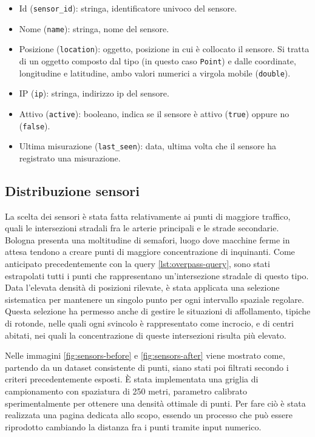 \begin{itemize}
  \item Id (\texttt{sensor\_id}): stringa, identificatore univoco del sensore.
  \item Nome (\texttt{name}): stringa, nome del sensore.
  \item Posizione (\texttt{location}): oggetto, posizione in cui è collocato il sensore.
        Si tratta di un oggetto composto dal tipo (in questo caso \texttt{Point}) e dalle coordinate,
        longitudine e latitudine, ambo valori numerici a virgola mobile (\texttt{double}).
  \item IP (\texttt{ip}): stringa, indirizzo ip del sensore.
  \item Attivo (\texttt{active}): booleano, indica se il sensore è attivo (\texttt{true})
        oppure no (\texttt{false}).
  \item Ultima misurazione (\texttt{last\_seen}): data, ultima volta che il sensore ha registrato una misurazione.
        \label{lst:sensors-properties}
\end{itemize}

\subsection{Distribuzione sensori}

La scelta dei sensori è stata fatta relativamente ai punti di maggiore traffico, quali le intersezioni stradali
fra le arterie principali e le strade secondarie. Bologna presenta una moltitudine di semafori, luogo dove macchine
ferme in attesa tendono a creare punti di maggiore concentrazione di inquinanti. Come anticipato precedentemente
con la query \ref{lst:overpass-query}, sono stati estrapolati tutti i punti che rappresentano un'intersezione
stradale di questo tipo. Data l'elevata densità di posizioni rilevate, è stata applicata una selezione sistematica
per mantenere un singolo punto per ogni intervallo spaziale regolare.
Questa selezione ha permesso anche di gestire le situazioni di affollamento, tipiche di rotonde,
nelle quali ogni svincolo è rappresentato come incrocio, e di centri abitati, nei quali la concentrazione
di queste intersezioni risulta più elevato.

Nelle immagini \ref{fig:sensors-before} e \ref{fig:sensors-after} viene mostrato come, partendo da un dataset
consistente di punti, siano stati poi filtrati secondo i criteri precedentemente esposti.
È stata implementata una griglia di campionamento con spaziatura di 250 metri, parametro calibrato
sperimentalmente per ottenere una densità ottimale di punti. Per fare ciò è stata realizzata una pagina dedicata
allo scopo, essendo un processo che può essere riprodotto cambiando la distanza fra i punti tramite input numerico.

